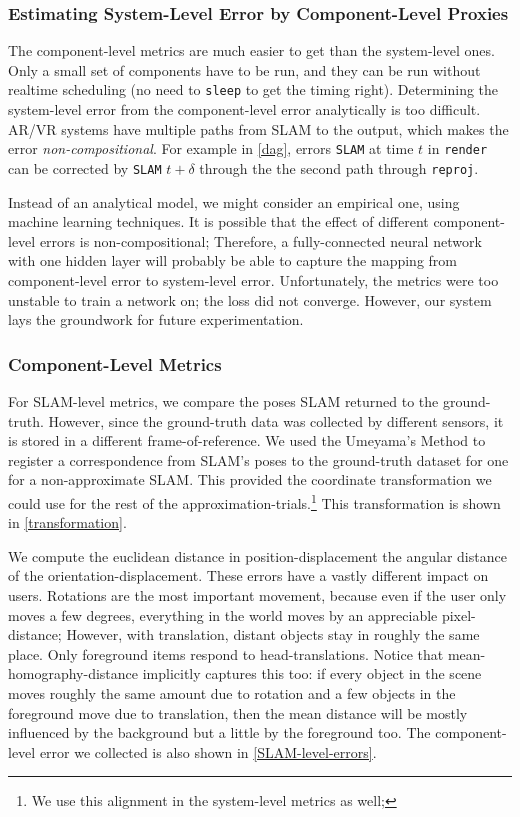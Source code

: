 \subsubsection{Estimating System-Level Error by Component-Level Proxies}

The component-level metrics are much easier to get than the system-level ones.
Only a small set of components have to be run, and they can be run without realtime scheduling (no need to \verb+sleep+ to get the timing right).
Determining the system-level error from the component-level error analytically is too difficult.
AR/VR systems have multiple paths from SLAM to the output, which makes the error \textit{non-compositional}.
For example in \cref{dag}, errors \verb+SLAM+ at time \(t\) in \verb+render+ can be corrected by \verb+SLAM+ \(t+\delta\) through the the second path through \verb+reproj+.

Instead of an analytical model, we might consider an empirical one, using machine learning techniques.
It is possible that the effect of different component-level errors is non-compositional;
Therefore, a fully-connected neural network with one hidden layer will probably be able to capture the mapping from component-level error to system-level error.
Unfortunately, the metrics were too unstable to train a network on; the loss did not converge.
However, our system lays the groundwork for future experimentation.

\subsubsection{Component-Level Metrics}

For SLAM-level metrics, we compare the poses SLAM returned to the ground-truth.
However, since the ground-truth data was collected by different sensors, it is stored in a different frame-of-reference.
We used the Umeyama's Method to register a correspondence from SLAM's poses to the ground-truth dataset for one for a non-approximate SLAM\cite{88573}.
This provided the coordinate transformation we could use for the rest of the approximation-trials.\footnote{We use this alignment in the system-level metrics as well; }
This transformation is shown in \cref{transformation}.

We compute the euclidean distance in position-displacement the angular distance of the orientation-displacement.
These errors have a vastly different impact on users.
Rotations are the most important movement, because even if the user only moves a few degrees, everything in the world moves by an appreciable pixel-distance;
However, with translation, distant objects stay in roughly the same place. Only foreground items respond to head-translations.
Notice that mean-homography-distance implicitly captures this too:
if every object in the scene moves roughly the same amount due to rotation and a few objects in the foreground move due to translation, then the mean distance will be mostly influenced by the background but a little by the foreground too.
The component-level error we collected is also shown in \cref{SLAM-level-errors}.
